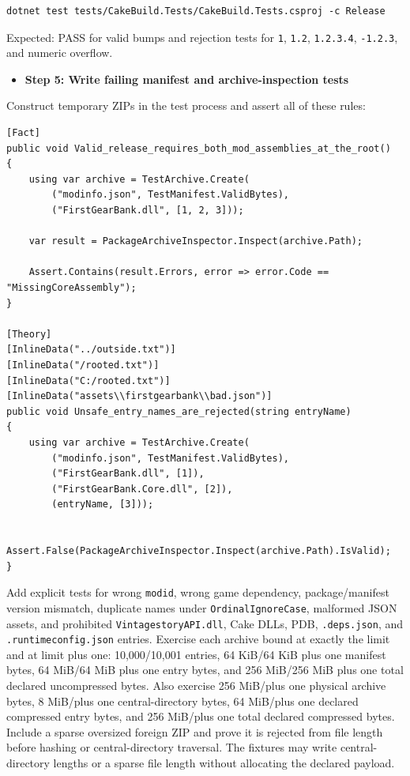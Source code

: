 \documentclass[
  10pt,
  letterpaper,
]{article}
\newcommand{\passthrough}[1]{#1}
\providecommand{\tightlist}{%
  \setlength{\itemsep}{0pt}\setlength{\parskip}{0pt}}
\begin{document}
\begin{lstlisting}
dotnet test tests/CakeBuild.Tests/CakeBuild.Tests.csproj -c Release
\end{lstlisting}

Expected: PASS for valid bumps and rejection tests for
\passthrough{\lstinline!1!}, \passthrough{\lstinline!1.2!},
\passthrough{\lstinline!1.2.3.4!}, \passthrough{\lstinline!-1.2.3!}, and
numeric overflow.

\begin{itemize}
\tightlist
\item[$\square$]
  \textbf{Step 5: Write failing manifest and archive-inspection tests}
\end{itemize}

Construct temporary ZIPs in the test process and assert all of these
rules:

\begin{lstlisting}
[Fact]
public void Valid_release_requires_both_mod_assemblies_at_the_root()
{
    using var archive = TestArchive.Create(
        ("modinfo.json", TestManifest.ValidBytes),
        ("FirstGearBank.dll", [1, 2, 3]));

    var result = PackageArchiveInspector.Inspect(archive.Path);

    Assert.Contains(result.Errors, error => error.Code == "MissingCoreAssembly");
}

[Theory]
[InlineData("../outside.txt")]
[InlineData("/rooted.txt")]
[InlineData("C:/rooted.txt")]
[InlineData("assets\\firstgearbank\\bad.json")]
public void Unsafe_entry_names_are_rejected(string entryName)
{
    using var archive = TestArchive.Create(
        ("modinfo.json", TestManifest.ValidBytes),
        ("FirstGearBank.dll", [1]),
        ("FirstGearBank.Core.dll", [2]),
        (entryName, [3]));

    Assert.False(PackageArchiveInspector.Inspect(archive.Path).IsValid);
}
\end{lstlisting}

Add explicit tests for wrong \passthrough{\lstinline!modid!}, wrong game
dependency, package/manifest version mismatch, duplicate names under
\passthrough{\lstinline!OrdinalIgnoreCase!}, malformed JSON assets, and
prohibited \passthrough{\lstinline!VintagestoryAPI.dll!}, Cake DLLs,
PDB, \passthrough{\lstinline!.deps.json!}, and
\passthrough{\lstinline!.runtimeconfig.json!} entries. Exercise each
archive bound at exactly the limit and at limit plus one: 10,000/10,001
entries, 64 KiB/64 KiB plus one manifest bytes, 64 MiB/64 MiB plus one
entry bytes, and 256 MiB/256 MiB plus one total declared uncompressed
bytes. Also exercise 256 MiB/plus one physical archive bytes, 8 MiB/plus
one central-directory bytes, 64 MiB/plus one declared compressed entry
bytes, and 256 MiB/plus one total declared compressed bytes. Include a
sparse oversized foreign ZIP and prove it is rejected from file length
before hashing or central-directory traversal. The fixtures may write
central-directory lengths or a sparse file length without allocating the
declared payload.
\end{document}
